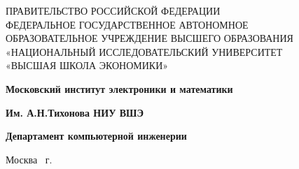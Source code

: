 \begin{titlepage}
	\begin{center}
		ПРАВИТЕЛЬСТВО РОССИЙСКОЙ ФЕДЕРАЦИИ \\
 		ФЕДЕРАЛЬНОЕ  ГОСУДАРСТВЕННОЕ АВТОНОМНОЕ \\
		ОБРАЗОВАТЕЛЬНОЕ УЧРЕЖДЕНИЕ ВЫСШЕГО ОБРАЗОВАНИЯ\\
		«НАЦИОНАЛЬНЫЙ ИССЛЕДОВАТЕЛЬСКИЙ УНИВЕРСИТЕТ\\
		«ВЫСШАЯ ШКОЛА ЭКОНОМИКИ»
	\end{center}
	
	\begin{center}
		\textbf{Московский институт электроники и математики}
		
		\textbf{Им. А.Н.Тихонова НИУ ВШЭ}
		
		\vspace{2ex}
		
		\textbf{Департамент компьютерной инженерии}
	\end{center}
	\vspace{1ex}	
	
	\vspace{1ex}
	\begin{center}

		
	\end{center}	

	\vspace{2ex}
	\vfill
	
	\vspace{2ex}
	
	\begin{flushright}
	
	\end{flushright}

	\vspace{5ex}
	\begin{center}
		Москва \the\year \, г.
	\end{center}
	
\end{titlepage}
\addtocounter{page}{1}